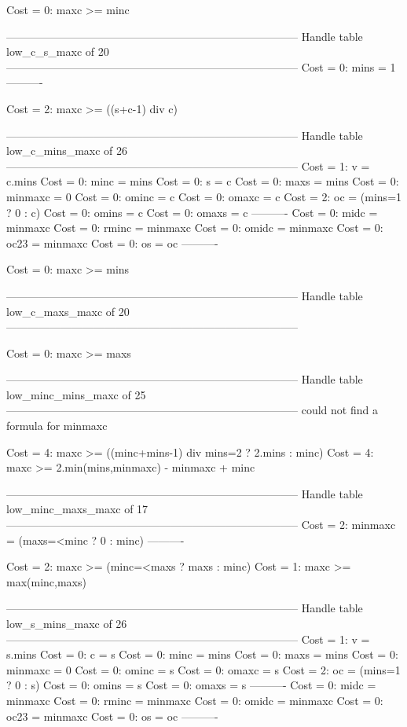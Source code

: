 Cost =  0:  maxc >= minc

--------------------------------------------------------------------------------
Handle table low_c_s_maxc of 20
--------------------------------------------------------------------------------
Cost =  0:  mins = 1
----------

Cost =  2:  maxc >= ((s+c-1) div c)

--------------------------------------------------------------------------------
Handle table low_c_mins_maxc of 26
--------------------------------------------------------------------------------
Cost =  1:  v       = c.mins
Cost =  0:  minc    = mins
Cost =  0:  s       = c
Cost =  0:  maxs    = mins
Cost =  0:  minmaxc = 0
Cost =  0:  ominc   = c
Cost =  0:  omaxc   = c
Cost =  2:  oc      = (mins=1 ? 0 : c)
Cost =  0:  omins   = c
Cost =  0:  omaxs   = c
----------
Cost =  0:  midc    = minmaxc
Cost =  0:  rminc   = minmaxc
Cost =  0:  omidc   = minmaxc
Cost =  0:  oc23    = minmaxc
Cost =  0:  os      = oc
----------

Cost =  0:  maxc >= mins

--------------------------------------------------------------------------------
Handle table low_c_maxs_maxc of 20
--------------------------------------------------------------------------------

Cost =  0:  maxc >= maxs

--------------------------------------------------------------------------------
Handle table low_minc_mins_maxc of 25
--------------------------------------------------------------------------------
could not find a formula for minmaxc

Cost =  4:  maxc >= ((minc+mins-1) div mins=2 ? 2.mins : minc)
Cost =  4:  maxc >= 2.min(mins,minmaxc) - minmaxc + minc

--------------------------------------------------------------------------------
Handle table low_minc_maxs_maxc of 17
--------------------------------------------------------------------------------
Cost =  2:  minmaxc = (maxs=<minc ? 0 : minc)
----------

Cost =  2:  maxc >= (minc=<maxs ? maxs : minc)
Cost =  1:  maxc >= max(minc,maxs)

--------------------------------------------------------------------------------
Handle table low_s_mins_maxc of 26
--------------------------------------------------------------------------------
Cost =  1:  v       = s.mins
Cost =  0:  c       = s
Cost =  0:  minc    = mins
Cost =  0:  maxs    = mins
Cost =  0:  minmaxc = 0
Cost =  0:  ominc   = s
Cost =  0:  omaxc   = s
Cost =  2:  oc      = (mins=1 ? 0 : s)
Cost =  0:  omins   = s
Cost =  0:  omaxs   = s
----------
Cost =  0:  midc    = minmaxc
Cost =  0:  rminc   = minmaxc
Cost =  0:  omidc   = minmaxc
Cost =  0:  oc23    = minmaxc
Cost =  0:  os      = oc
----------

